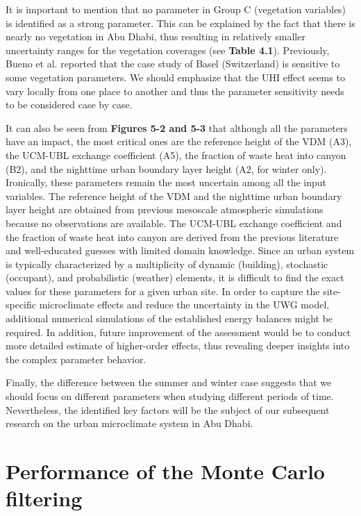 It is important to mention that no parameter in Group C (vegetation variables) is identified as a strong parameter. This can be explained by the fact that there is nearly no vegetation in Abu Dhabi, thus resulting in relatively smaller uncertainty ranges for the vegetation coverages (see \textbf{Table 4.1}). Previously, Bueno et al. \cite{bueno2013urban} reported that the case study of Basel (Switzerland) is sensitive to some vegetation parameters. We should emphasize that the UHI effect seems to vary locally from one place to another and thus the parameter sensitivity needs to be considered case by case.

It can also be seen from \textbf{Figures 5-2 and 5-3} that although all the parameters have an impact, the most critical ones are the reference height of the VDM (A3), the UCM-UBL exchange coefficient (A5), the fraction of waste heat into canyon (B2), and the nighttime urban boundary layer height (A2, for winter only). Ironically, these parameters remain the most uncertain among all the input variables. The reference height of the VDM and the nighttime urban boundary layer height are obtained from previous mesoscale atmospheric simulations \cite{li2013multi,hidalgo2008urban} because no observations are available. The UCM-UBL exchange coefficient and the fraction of waste heat into canyon are derived from the previous literature \cite{hanna2010wind} and well-educated guesses with limited domain knowledge. Since an urban system is typically characterized by a multiplicity of dynamic (building), stochastic (occupant), and probabilistic (weather) elements, it is difficult to find the exact values for these parameters for a given urban site. In order to capture the site-specific microclimate effects and reduce the uncertainty in the UWG model, additional numerical simulations of the established energy balances might be required. In addition, future improvement of the assessment would be to conduct more detailed estimate of higher-order effects, thus revealing deeper insights into the complex parameter behavior.

Finally, the difference between the summer and winter case suggests that we should focus on different parameters when studying different periods of time. Nevertheless, the identified key factors will be the subject of our subsequent research on the urban microclimate system in Abu Dhabi.

\section{Performance of the Monte Carlo filtering}

